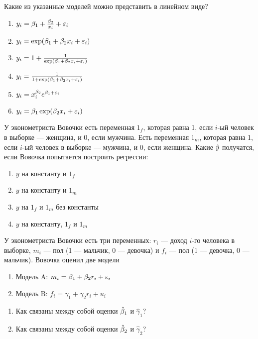 \documentclass[pdftex,11pt,openany]{book}
\begin{document}
\begin{problem}
 Какие из указанные моделей можно представить в линейном виде?
\begin{enumerate}
\item $y_i=\beta_1+\frac{\beta_2}{x_i}+\varepsilon_i$
\item $y_i=\exp(\beta_1+\beta_2 x_i+\varepsilon_i)$
\item $y_i=1+\frac{1}{\exp(\beta_1+\beta_2 x_i+\varepsilon_i)}$
\item $y_i=\frac{1}{1+\exp(\beta_1+\beta_2 x_i+\varepsilon_i)}$
\item $y_i=x_i^{\beta_2}e^{\beta_1+\varepsilon_i}$
\item $y_i=\beta_1\exp(\beta_2 x_i + \varepsilon_i)$
\end{enumerate}
\end{problem}

\begin{solution}
\newpage
\end{solution}



\begin{problem}
 У эконометриста Вовочки есть переменная $1_f$, которая равна 1, если $i$-ый человек в выборке --- женщина, и 0, если мужчина. Есть переменная $1_m$, которая равна 1, если $i$-ый человек в выборке --- мужчина, и 0, если женщина. Какие $\hat{y}$ получатся, если Вовочка попытается построить регрессии:
\begin{enumerate}
\item $y$ на константу и $1_f$
\item $y$ на константу и $1_m$
\item $y$ на $1_f$ и $1_m$ без константы
\item $y$ на константу, $1_f$ и $1_m$
\end{enumerate}
\end{problem}

\begin{solution}
\end{solution}
 


\begin{problem}
 У эконометриста Вовочки есть три переменных: $r_i$ --- доход $i$-го человека в выборке, $m_i$ --- пол (1 --- мальчик, 0 --- девочка) и $f_i$ --- пол (1 --- девочка, 0 --- мальчик). Вовочка оценил две модели
\begin{enumerate}
\item[] Модель A: $m_i=\beta_1+\beta_2 r_i+\varepsilon_i$
\item[] Модель B: $f_i=\gamma_1+\gamma_2 r_i+u_i$
\end{enumerate}
\begin{enumerate}
\item Как связаны между собой оценки $\hat{\beta}_1$ и $\hat{\gamma}_1$?
\item Как связаны между собой оценки $\hat{\beta}_2$ и $\hat{\gamma}_2$? 
\end{enumerate}
\end{problem}
\end{document}
